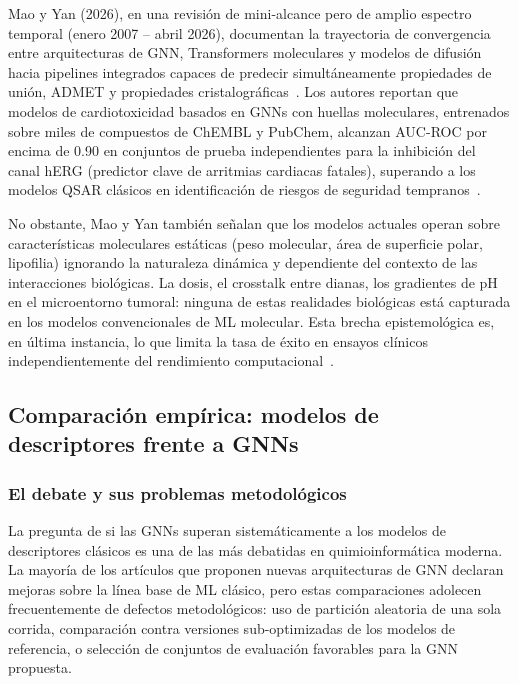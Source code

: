 Mao y Yan (2026), en una revisión de mini-alcance pero de amplio espectro temporal (enero 2007 -- abril 2026), documentan la trayectoria de convergencia entre arquitecturas de GNN, Transformers moleculares y modelos de difusión hacia pipelines integrados capaces de predecir simultáneamente propiedades de unión, ADMET y propiedades cristalográficas~\cite{mao_artificial_2026}. Los autores reportan que modelos de cardiotoxicidad basados en GNNs con huellas moleculares, entrenados sobre miles de compuestos de ChEMBL y PubChem, alcanzan AUC-ROC por encima de 0.90 en conjuntos de prueba independientes para la inhibición del canal hERG (predictor clave de arritmias cardiacas fatales), superando a los modelos QSAR clásicos en identificación de riesgos de seguridad tempranos~\cite{mao_artificial_2026}.
 
No obstante, Mao y Yan también señalan que los modelos actuales operan sobre características moleculares estáticas (peso molecular, área de superficie polar, lipofilia) ignorando la naturaleza dinámica y dependiente del contexto de las interacciones biológicas. La dosis, el crosstalk entre dianas, los gradientes de pH en el microentorno tumoral: ninguna de estas realidades biológicas está capturada en los modelos convencionales de ML molecular. Esta brecha epistemológica es, en última instancia, lo que limita la tasa de éxito en ensayos clínicos independientemente del rendimiento computacional~\cite{mao_artificial_2026}.



\subsection{Comparación empírica: modelos de descriptores frente a GNNs}
\label{ssec:arte_comparacion}


\subsubsection{El debate y sus problemas metodológicos}
 
La pregunta de si las GNNs superan sistemáticamente a los modelos
de descriptores clásicos es una de las más debatidas en quimioinformática moderna. La mayoría de los artículos que proponen nuevas arquitecturas de GNN declaran mejoras sobre la línea base de ML clásico, pero estas comparaciones adolecen frecuentemente de defectos metodológicos: uso de partición aleatoria de una sola corrida, comparación contra versiones sub-optimizadas de los modelos de referencia, o selección de conjuntos de evaluación favorables para la GNN propuesta.
 
